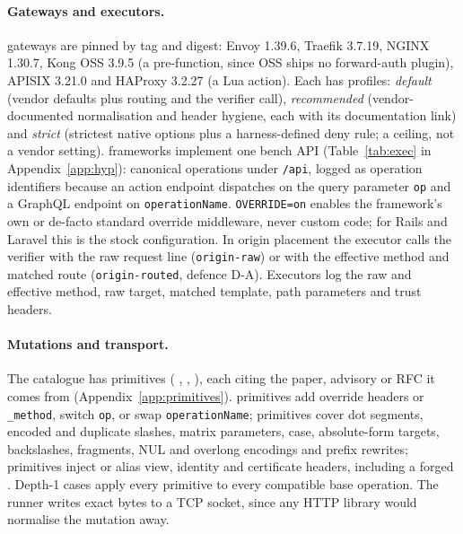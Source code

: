 \paragraph{Gateways and executors.} \NumGateways{} gateways are pinned by tag
and digest: Envoy 1.39.6, Traefik 3.7.19, NGINX 1.30.7, Kong OSS 3.9.5 (a
pre-function, since OSS ships no forward-auth plugin), APISIX 3.21.0 and
HAProxy 3.2.27 (a Lua action). Each has \NumGatewayProfiles{} profiles:
\emph{default} (vendor defaults plus routing and the verifier call),
\emph{recommended} (vendor-documented normalisation and header hygiene, each
with its documentation link) and \emph{strict} (strictest native options plus
a harness-defined deny rule; a ceiling, not a vendor setting).
\NumFrameworks{} frameworks implement one bench API (Table~\ref{tab:exec} in
Appendix~\ref{app:hyp}): \NumBenchOps{} canonical operations under
\texttt{/api}, logged as \NumBenchOpIds{} operation identifiers because an
action endpoint dispatches on the query parameter \texttt{op} and a GraphQL
endpoint on \texttt{operationName}. \texttt{OVERRIDE=on} enables the
framework's own or de-facto standard override middleware, never custom code;
for Rails and Laravel this is the stock configuration. In origin placement the
executor calls the verifier with the raw request line
(\texttt{origin-raw}) or with the effective method and matched route
(\texttt{origin-routed}, defence D-A). Executors log the raw and effective
method, raw target, matched template, path parameters and trust headers.

\paragraph{Mutations and transport.} The catalogue has \NumPrimitives{}
primitives (\NumPrimitivesGOne{} \GA, \NumPrimitivesGTwo{} \GB,
\NumPrimitivesGThree{} \GC), each citing the paper, advisory or RFC it comes
from (Appendix~\ref{app:primitives}). \GA primitives add override headers or
\texttt{\_method}, switch \texttt{op}, or swap \texttt{operationName}; \GB
primitives cover dot segments, encoded and duplicate slashes, matrix
parameters, case, absolute-form targets, backslashes, fragments, NUL and
overlong encodings and prefix rewrites; \GC primitives inject or alias view,
identity and certificate headers, including a forged .
Depth-1 cases apply every primitive to every compatible base operation. The
runner writes exact bytes to a TCP socket, since any HTTP library would
normalise the mutation away.


